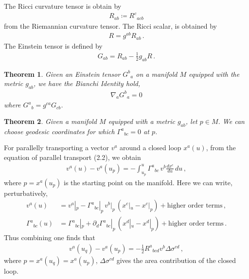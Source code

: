 \documentclass[11pt, onesided]{book}
\theoremstyle{break}
\theoremstyle{break}
\newtheorem{thm}{Theorem}[section]
\newcommand{\pd}{\partial}
\begin{document}
The Ricci curvature tensor is obtain by
\begin{align*}
R_{ab} \coloneqq R^c{}_{acb}
\end{align*}
from the Riemannian curvature tensor. The Ricci scalar, is obtained by
\begin{align*}
R = g^{ab}R_{ab}\,.
\end{align*}
The Einstein tensor is defined by
\begin{align*}
G_{ab} = R_{ab} - \frac{1}{2}g_{ab} R\,.
\end{align*}
\begin{thm}
Given an Einstein tensor $G^b{}_a$ on a manifold $M$ equipped with the metric $g_{ab}$, we have the Bianchi Identity hold,
\begin{align*}
\nabla_a G^b{}_a = 0
\end{align*}
where $G^a{}_b = g^{ca}G_{cb}$. 
\end{thm}
\begin{thm}
Given a manifold $M$ equipped with a metric $g_{ab}$, let $p \in M$. We can choose geodesic coordinates for which $\Gamma^a{}_{bc} = 0$ at $p$. 
\end{thm}

For parallelly transporting a vector $v^a$ around a closed loop $x^a(u)$, from the equation of parallel transport (2.2), we obtain
\begin{align*}
v^a(u) - v^a(u_p) = -\int_{u_p}^{u} \Gamma^a{}_{bc} \, v^b \frac{dx^c}{du}\, du\,,
\end{align*}
where $p = x^a(u_p)$ is the starting point on the manifold. Here we can write, perturbatively, 
\begin{align*}
v^a(u) &= v^a|_p - \Gamma^a{}_{bc}|_p \, v^b|_p \, (x^c|_u - x^c|_p) + \text{higher order terms}\,,\\
\Gamma^a{}_{bc}(u) &= \Gamma^a{}_{bc}|_p + \pd_d \Gamma^a{}_{bc}|_p \, (x^d|_u - x^d|_p) + \text{higher order terms}\,.
\end{align*}
Thus combining one finds that
\begin{align*}
v^a(u_q) - v^a(u_p) = -\frac{1}{2}R^a{}_{bcd}v^b \Delta \sigma^{cd}\,,
\end{align*}
where $p = x^a(u_q) = x^a(u_p)$, $\Delta \sigma^{cd}$ gives the area contribution of the closed loop. \\
\end{document}
